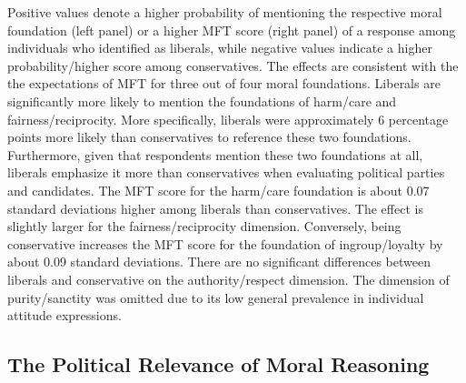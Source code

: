 \documentclass[12pt]{article}
\begin{document}
Positive values denote a higher probability of mentioning the respective moral foundation (left panel) or a higher MFT score (right panel) of a response among individuals who identified as liberals, while negative values indicate a higher probability/higher score among conservatives. The effects are consistent with the the expectations of MFT for three out of four moral foundations. Liberals are significantly more likely to mention the foundations of harm/care and fairness/reciprocity. More specifically, liberals were approximately 6 percentage points more likely than conservatives to reference these two foundations. Furthermore, given that respondents mention these two foundations at all, liberals emphasize it more than conservatives when evaluating political parties and candidates. The MFT score for the harm/care foundation is about 0.07 standard deviations higher among liberals than conservatives. The effect is slightly larger for the fairness/reciprocity dimension. Conversely, being conservative increases the MFT score for the foundation of ingroup/loyalty by about 0.09 standard deviations. There are no significant differences between liberals and conservative on the authority/respect dimension. The dimension of purity/sanctity was omitted due to its low general prevalence in individual attitude expressions.



\subsection*{The Political Relevance of Moral Reasoning}
\end{document}
